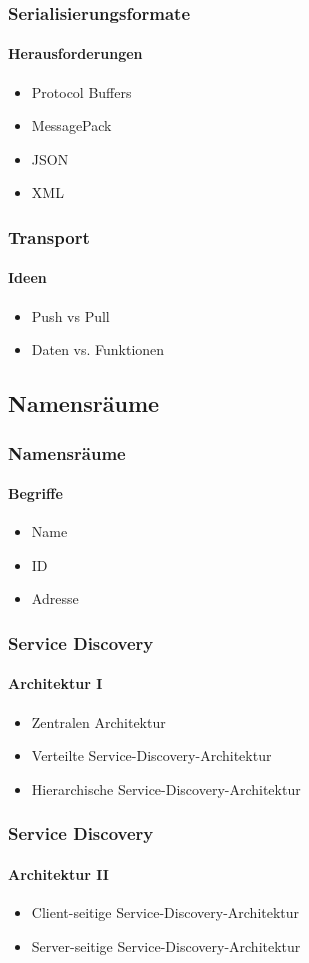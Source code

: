 \begin{frame}
  \frametitle{Serialisierungsformate}
  \framesubtitle{Herausforderungen}
  \begin{itemize}
    \item Protocol Buffers
    \item MessagePack
    \item JSON
    \item XML
  \end{itemize}
\end{frame}

\begin{frame}
  \frametitle{Transport}
  \framesubtitle{Ideen}
  \begin{itemize}
    \item Push vs Pull
    \item Daten vs. Funktionen
  \end{itemize}
\end{frame}

\subsection{Namensräume}
\begin{frame}
  \frametitle{Namensräume}
  \framesubtitle{Begriffe}
  \begin{itemize}
    \item Name
    \item ID
    \item Adresse
  \end{itemize}
\end{frame}

\begin{frame}
  \frametitle{Service Discovery}
  \framesubtitle{Architektur I}
  \begin{itemize}
    \item Zentralen Architektur 
    \item Verteilte Service-Discovery-Architektur
    \item Hierarchische Service-Discovery-Architektur
  \end{itemize}
\end{frame}

\begin{frame}
  \frametitle{Service Discovery}
  \framesubtitle{Architektur II}
  \begin{itemize}
    \item Client-seitige Service-Discovery-Architektur
    \item Server-seitige Service-Discovery-Architektur
  \end{itemize}
\end{frame}

